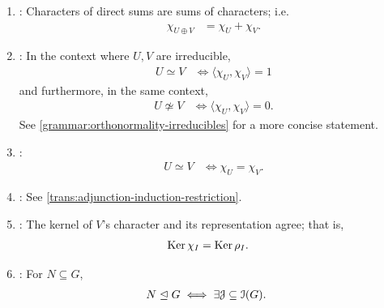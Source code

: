 \begin{enumerate}[leftmargin=*, label=(T\arabic*)]
{     $\FinVect^G (U, V)$ :
    \begin{align*}
      \dim \FinVect^G (U, V)
      &= \langle \chi_U, \chi_V \rangle
      .
    \end{align*}
  }
  \item\label{trans:direct-sum} {
    : Characters of direct sums are sums of characters; i.e.
    \begin{align*}
      \chi_{U \oplus V}
      &= \chi_U + \chi_V
      .
    \end{align*}
  }
  \item\label{trans:equivalence-irreducibles} {
    : In the context where $U, V$ are irreducible, 
    \begin{align*}
      U \simeq V
      &\iff \langle \chi_U, \chi_V \rangle = 1
    \end{align*}
    and furthermore, in the same context, 
    \begin{align*}
      U \not\simeq V
      &\iff \langle \chi_U, \chi_V \rangle = 0
      .
    \end{align*}
    See \ref{grammar:orthonormality-irreducibles} for a more concise statement.
  }
  \item\label{trans:equivalence} {
    :
    \begin{align*}
      U \simeq V
      &\iff \chi_U = \chi_V
      .
    \end{align*}
  }
  \item\label{trans:reciprocity} {
    : See \ref{trans:adjunction-induction-restriction}.
  }
  \item\label{trans:kernels} {
    : The kernel of $V$'s character and its representation agree; that is,
    \begin{align*}
      \operatorname{Ker} \chi_I
      &= \operatorname{Ker} \rho_I
      .
    \end{align*}
    \pan {}
  }
  \item\label{trans:normal-subgroups} {
    : For $N \subseteq G$,
    \begin{align*}
      N \trianglelefteq G
      &\iff \exists \mathcal{J} \subseteq \Irred(G) .\;

\end{align*}}
\end{enumerate}
